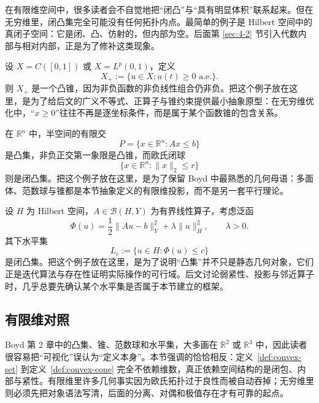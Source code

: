 \begin{remark}
在有限维空间中，很多读者会不自觉地把“闭凸”与“具有明显体积”联系起来。但在无穷维里，闭凸集完全可能没有任何拓扑内点。最简单的例子是 Hilbert 空间中的真闭子空间：它是闭、凸、仿射的，但内部为空。后面第 \ref{sec:4-2} 节引入代数内部与相对内部，正是为了修补这类现象。
\end{remark}

\begin{example}\label{ex:function-space-positive-cone}
设 $X=C([0,1])$ 或 $X=L^p(0,1)$，定义
\[
X_+:=\{u\in X:u(t)\ge 0 \text{ a.e.}\}.
\]
则 $X_+$ 是一个凸锥，因为非负函数的非负线性组合仍非负。把这个例子放在这里，是为了给后文的广义不等式、正算子与锥约束提供最小抽象原型：在无穷维优化中，“$x\ge 0$”往往不再是逐坐标条件，而是属于某个函数锥的包含关系。
\end{example}

\begin{example}\label{ex:polytope-and-ball}
在 $\mathbb R^n$ 中，半空间的有限交
\[
P=\{x\in\mathbb R^n:Ax\le b\}
\]
是凸集，非负正交第一象限是凸锥，而欧氏闭球
\[
\{x\in\mathbb R^n:\|x\|_2\le r\}
\]
则是闭凸集。把这个例子放在这里，是为了保留 Boyd 中最熟悉的几何母语：多面体、范数球与锥都是本节抽象定义的有限维投影，而不是另一套平行理论。
\end{example}

\begin{example}\label{ex:regularization-level-set}
设 $H$ 为 Hilbert 空间，$A\in\mathcal B(H,Y)$ 为有界线性算子，考虑泛函
\[
\Phi(u)=\frac12\|Au-b\|_Y^2+\lambda\|u\|_H^2,
\qquad \lambda>0.
\]
其下水平集
\[
L_c:=\{u\in H:\Phi(u)\le c\}
\]
是闭凸集。把这个例子放在这里，是为了说明“凸集”并不只是静态几何对象，它们正是迭代算法与存在性证明实际操作的可行域。后文讨论弱紧性、投影与邻近算子时，几乎总要先确认某个水平集是否属于本节建立的框架。
\end{example}

\subsection*{有限维对照}

Boyd 第 2 章中的凸集、锥、范数球和水平集，大多画在 $\mathbb R^2$ 或 $\mathbb R^3$ 中，因此读者很容易把“可视化”误认为“定义本身”。本节强调的恰恰相反：定义~\ref{def:convex-set} 到定义~\ref{def:convex-cone} 完全不依赖维数，真正依赖空间结构的是闭包、内部与紧性。有限维里许多几何事实因为欧氏拓扑过于良性而被自动吞掉；无穷维里则必须先把对象语法写清，后面的分离、对偶和极值存在才有可靠的起点。


